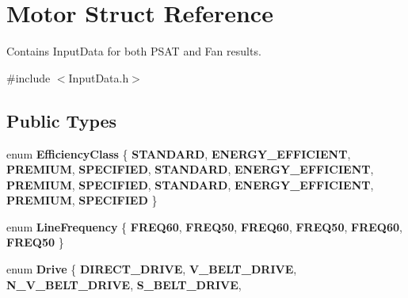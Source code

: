 \hypertarget{struct_motor}{}\section{Motor Struct Reference}
\label{struct_motor}


Contains Input\+Data for both P\+S\+AT and Fan results.  




{\ttfamily \#include $<$Input\+Data.\+h$>$}

\subsection*{Public Types}
\begin{DoxyCompactItemize}
\item 
\mbox{\label{struct_motor_afa022971ae062406a9f588c601673d4e}} 
enum {\bfseries Efficiency\+Class} \{ \newline
{\bfseries S\+T\+A\+N\+D\+A\+RD}, 
{\bfseries E\+N\+E\+R\+G\+Y\+\_\+\+E\+F\+F\+I\+C\+I\+E\+NT}, 
{\bfseries P\+R\+E\+M\+I\+UM}, 
{\bfseries S\+P\+E\+C\+I\+F\+I\+ED}, 
\newline
{\bfseries S\+T\+A\+N\+D\+A\+RD}, 
{\bfseries E\+N\+E\+R\+G\+Y\+\_\+\+E\+F\+F\+I\+C\+I\+E\+NT}, 
{\bfseries P\+R\+E\+M\+I\+UM}, 
{\bfseries S\+P\+E\+C\+I\+F\+I\+ED}, 
\newline
{\bfseries S\+T\+A\+N\+D\+A\+RD}, 
{\bfseries E\+N\+E\+R\+G\+Y\+\_\+\+E\+F\+F\+I\+C\+I\+E\+NT}, 
{\bfseries P\+R\+E\+M\+I\+UM}, 
{\bfseries S\+P\+E\+C\+I\+F\+I\+ED}
 \}
\item 
\mbox{\label{struct_motor_acee1bdf1b684ad36cb80dc2829d9fcee}} 
enum {\bfseries Line\+Frequency} \{ \newline
{\bfseries F\+R\+E\+Q60}, 
{\bfseries F\+R\+E\+Q50}, 
{\bfseries F\+R\+E\+Q60}, 
{\bfseries F\+R\+E\+Q50}, 
\newline
{\bfseries F\+R\+E\+Q60}, 
{\bfseries F\+R\+E\+Q50}
 \}
\item 
\mbox{\label{struct_motor_a7ebc378cf0aee50a8d2b99f0e0a53047}} 
enum {\bfseries Drive} \{ \newline
{\bfseries D\+I\+R\+E\+C\+T\+\_\+\+D\+R\+I\+VE}, 
{\bfseries V\+\_\+\+B\+E\+L\+T\+\_\+\+D\+R\+I\+VE}, 
{\bfseries N\+\_\+\+V\+\_\+\+B\+E\+L\+T\+\_\+\+D\+R\+I\+VE}, 
{\bfseries S\+\_\+\+B\+E\+L\+T\+\_\+\+D\+R\+I\+VE}, 
\newline

\end{DoxyCompactItemize}
